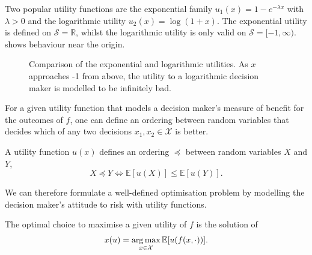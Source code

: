 \documentclass[main.tex]{subfiles}
\begin{document}
\begin{example}
  Two popular utility functions are the exponential family
  $u_1(x)=1-e^{-\lambda x}$ with $\lambda>0$ and the logarithmic
  utility $u_2(x)=\log(1+x)$.
  The exponential utility is defined on $\mathcal{S} =\mathbb{R}$,
  whilst the logarithmic utility is only valid on $\mathcal
  S=[-1,\infty)$.
   shows behaviour near the origin.
  \begin{figure}[htbp]
    \centering
    \caption{Comparison of the exponential and logarithmic
      utilities. As $x$ approaches -1 from above, the utility to a logarithmic
      decision maker is modelled to be infinitely bad.
    }\label{fig:example_utilities}
  \end{figure}
\end{example}

For a given utility function that models a decision maker's measure of
benefit for the outcomes of $f$, one can define an ordering
between random variables that decides which of any two decisions
$x_1,x_2\in\mathcal{X}$ is better.
\begin{mydef}
  A utility function $u(x)$ defines an ordering $\preceq$ between random
  variables $X$ and $Y$,
  \begin{equation}
    X\preceq Y \Leftrightarrow \mathbb{E}[u(X)] \leq \mathbb{E}[u(Y)].
  \end{equation}
\end{mydef}

We can therefore formulate a well-defined optimisation problem by
modelling the decision maker's attitude to risk with utility functions.

\begin{problem}
  The optimal choice to maximise a given utility of $f$ is the
  solution of
  \begin{align}
    x(u)=\operatorname*{arg\,max}_{x\in\mathcal{X}} \mathbb{E}[u(f(x,\cdot))].
  \end{align}
\end{problem}
\end{document}
